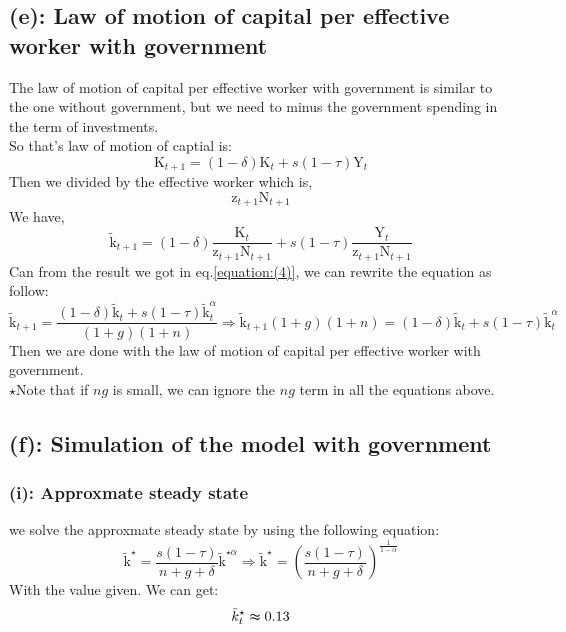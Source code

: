 \documentclass[12pt]{article}
\begin{document}
\subsection*{(e): Law of motion of capital per effective worker with government}
The law of motion of capital per effective worker with government is similar to the one without government, but we need to minus the government spending in the term of investments. \\
So that's law of motion of captial is:
\begin{equation}
    \mathrm{K}_{t+1} = (1-\delta)\mathrm{K}_t + s(1 - \tau)\mathrm{Y}_t
\end{equation}
Then we divided by the effective worker which is,
\begin{equation}
    \mathrm{z}_{t+1}\mathrm{N}_{t+1}
\end{equation}
We have,
\begin{equation}
    \tilde{\mathrm{k}}_{t+1} = (1-\delta)\frac{\mathrm{K}_t}{\mathrm{z}_{t+1}\mathrm{N}_{t+1}} + s(1 - \tau)\frac{\mathrm{Y}_t}{\mathrm{z}_{t+1}\mathrm{N}_{t+1}}
    \label{equation:(19)}
\end{equation}
Can from the result we got in eq.\ref{equation:(4)}, we can rewrite the equation as follow:
\begin{equation}
    \tilde{\mathrm{k}}_{t+1} = \frac{(1-\delta)\tilde{\mathrm{k}}_t + s(1 - \tau)\tilde{\mathrm{k}}_t^{\alpha}}{(1+g)(1+n)} \Rightarrow  \tilde{\mathrm{k}}_{t+1}(1+g)(1+n) = (1-\delta)\tilde{\mathrm{k}}_t + s(1 - \tau)\tilde{\mathrm{k}}_t^{\alpha}
    \label{equation:(20)}
\end{equation}
Then we are done with the law of motion of capital per effective worker with government. \\

$\star$Note that if $ng$ is small, we can ignore the $ng$ term in all the equations above. \\
\subsection*{(f): Simulation of the model with government}
\subsubsection*{(i): Approxmate steady state}
we solve the approxmate steady state by using the following equation:
\begin{equation}
    \tilde{\mathrm{k}}^{\star} = \frac{s(1 - \tau)}{n+g+\delta}\tilde{\mathrm{k}}^{\star\alpha} \Rightarrow \tilde{\mathrm{k}}^{\star} = (\frac{s(1 - \tau)}{n+g+\delta})^{\frac{1}{1-\alpha}}
\end{equation}
With the value given. We can get:
\begin{equation}
    \tilde{k}_t^{\star}  \thickapprox 0.13
\end{equation}
\end{document}
